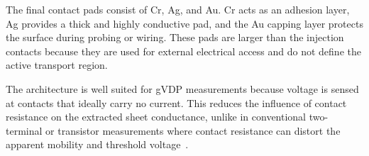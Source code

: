 The final contact pads consist of Cr, Ag, and Au. Cr acts as an adhesion layer, Ag provides a thick and highly conductive pad, and the Au capping layer protects the surface during probing or wiring. These pads are larger than the injection contacts because they are used for external electrical access and do not define the active transport region.

The architecture is well suited for gVDP measurements because voltage is sensed at contacts that ideally carry no current. This reduces the influence of contact resistance on the extracted sheet conductance, unlike in conventional two-terminal or transistor measurements where contact resistance can distort the apparent mobility and threshold voltage~\cite{Rolin2017GVDP,Bittle2016MobilityOverestimation,Natali2012ChargeInjection}.

